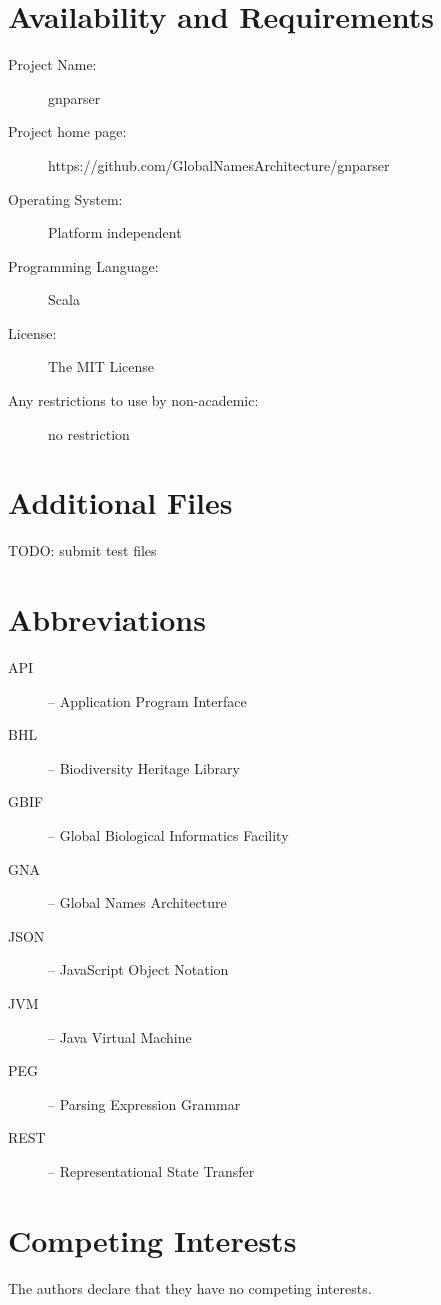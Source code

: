\documentclass{bmcart}
\begin{document}
\section*{Availability and Requirements}

\begin{description}
  \item[Project Name:] gnparser
  \item[Project home page:] https://github.com/GlobalNamesArchitecture/gnparser
  \item[Operating System:] Platform independent
  \item[Programming Language:] Scala
  \item[License:] The MIT License
  \item[Any restrictions to use by non-academic:] no restriction
\end{description}

\section*{Additional Files}

TODO: submit test files

\section*{Abbreviations}

\begin{description}
  \item[API] -- Application Program Interface
  \item[BHL] -- Biodiversity Heritage Library
  \item[GBIF] -- Global Biological Informatics Facility
  \item[GNA] -- Global Names Architecture
  \item[JSON] -- JavaScript Object Notation
  \item[JVM] -- Java Virtual Machine
  \item[PEG] -- Parsing Expression Grammar
  \item[REST] -- Representational State Transfer
\end{description}

\section*{Competing Interests}

The authors declare that they have no competing interests.
\end{document}
